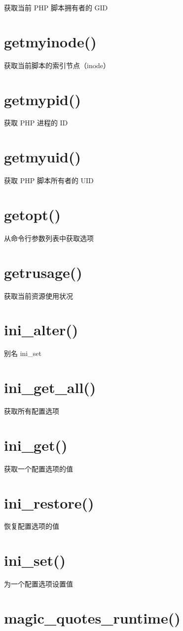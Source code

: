 获取当前 PHP 脚本拥有者的 GID
\section{getmyinode()}

获取当前脚本的索引节点（inode）
\section{getmypid()}

获取 PHP 进程的 ID
\section{getmyuid()}

获取 PHP 脚本所有者的 UID
\section{getopt()}

从命令行参数列表中获取选项
\section{getrusage()}

获取当前资源使用状况
\section{ini\_alter()}

别名 ini\_set
\section{ini\_get\_all()}

获取所有配置选项
\section{ini\_get()}

获取一个配置选项的值
\section{ini\_restore()}

恢复配置选项的值
\section{ini\_set()}

为一个配置选项设置值
\section{magic\_quotes\_runtime()}

